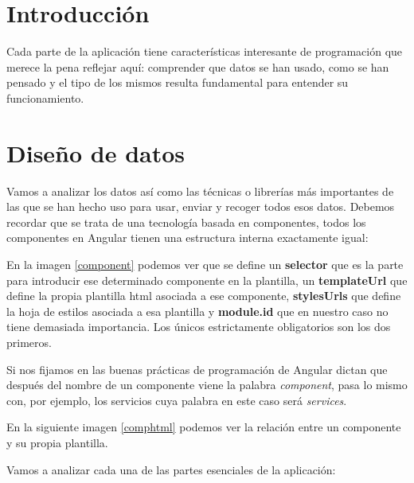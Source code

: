 \section{Introducción}\label{introducciondiseno}
Cada parte de la aplicación tiene características interesante de programación que merece la pena reflejar aquí: comprender que datos se han usado, como se han pensado y el tipo de los mismos resulta fundamental para entender su funcionamiento. 

\section{Diseño de datos}\label{datos}
Vamos a analizar los datos así como las técnicas o librerías más importantes de las que se han hecho uso para usar, enviar y recoger todos esos datos. Debemos recordar que se trata de una tecnología basada en componentes, todos los componentes en Angular tienen una estructura interna exactamente igual:

\label{component}

En la  imagen \ref{component} podemos ver que se define un \textbf{selector} que es la parte para introducir ese determinado componente en la plantilla, un \textbf{templateUrl} que define la propia plantilla html asociada a ese componente, \textbf{stylesUrls} que define la hoja de estilos asociada a esa plantilla y \textbf{module.id} que en nuestro caso no tiene demasiada importancia.  Los únicos estrictamente obligatorios son los dos primeros.

Si nos fijamos en las buenas prácticas de programación de Angular dictan que después del nombre de un componente viene la palabra \emph{component}, pasa lo mismo con, por ejemplo, los servicios cuya palabra en este caso será \emph{services}.

En la siguiente imagen \ref{comphtml} podemos ver la relación entre un componente y su propia plantilla.

\label{comphtml}


Vamos a analizar cada una de las partes esenciales de la aplicación:


